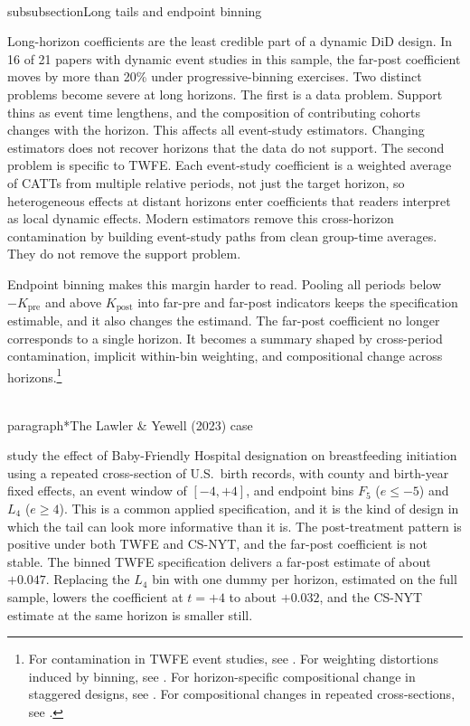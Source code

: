 \documentclass[11pt]{article}
\begin{document}
\\subsubsection{Long tails and endpoint binning}
\label{sec:binning}

Long-horizon coefficients are the least credible part of a dynamic DiD design. In 16 of 21 papers with dynamic event studies in this sample, the far-post coefficient moves by more than 20\% under progressive-binning exercises. Two distinct problems become severe at long horizons. The first is a data problem. Support thins as event time lengthens, and the composition of contributing cohorts changes with the horizon. This affects all event-study estimators. Changing estimators does not recover horizons that the data do not support. The second problem is specific to TWFE. Each event-study coefficient is a weighted average of CATTs from multiple relative periods, not just the target horizon, so heterogeneous effects at distant horizons enter coefficients that readers interpret as local dynamic effects. Modern estimators remove this cross-horizon contamination by building event-study paths from clean group-time averages. They do not remove the support problem.

Endpoint binning makes this margin harder to read. Pooling all periods below $-K_{\text{pre}}$ and above $K_{\text{post}}$ into far-pre and far-post indicators keeps the specification estimable, and it also changes the estimand. The far-post coefficient no longer corresponds to a single horizon. It becomes a summary shaped by cross-period contamination, implicit within-bin weighting, and compositional change across horizons.\footnote{For contamination in TWFE event studies, see \textcite{sun2021estimating}. For weighting distortions induced by binning, see \textcite{borusyak2023did_imputation}. For horizon-specific compositional change in staggered designs, see \textcite{callaway2021difference}. For compositional changes in repeated cross-sections, see \textcite{sant2026difference}.}

\\paragraph*{The Lawler \& Yewell (2023) case}

\textcite{lawler2023effect} study the effect of Baby-Friendly Hospital designation on breastfeeding initiation using a repeated cross-section of U.S.\ birth records, with county and birth-year fixed effects, an event window of $[-4,+4]$, and endpoint bins $F_5$ ($e \leq -5$) and $L_4$ ($e \geq 4$). This is a common applied specification, and it is the kind of design in which the tail can look more informative than it is. The post-treatment pattern is positive under both TWFE and CS-NYT, and the far-post coefficient is not stable. The binned TWFE specification delivers a far-post estimate of about $+0.047$. Replacing the $L_4$ bin with one dummy per horizon, estimated on the full sample, lowers the coefficient at $t=+4$ to about $+0.032$, and the CS-NYT estimate at the same horizon is smaller still.
\end{document}

